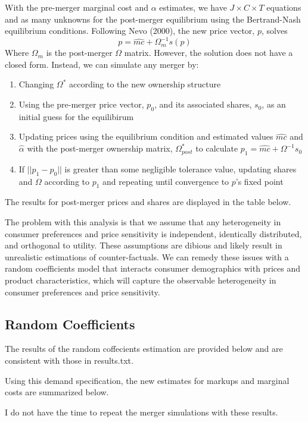 \documentclass{article}
\newcommand{\ahat}{\hat{\alpha}}
\begin{document}
\begin{center}
        
\end{center}
With the pre-merger marginal cost and $\alpha$ estimates, we have $J\times C\times T$ equations and as many unknowns for the post-merger equilibrium using the Bertrand-Nash equilibrium conditions. Following Nevo (2000), the new price vector, $p$, solves \[ 
        p = \hat{mc} + \Omega_{m}^{-1}s(p)
\]
Where $\Omega_m$ is the post-merger $\Omega$ matrix. 
However, the solution does not have a closed form. Instead, we can simulate any merger by:
\begin{enumerate}
        \item Changing $\Omega^*$ according to the new ownership structure
        \item Using the pre-merger price vector, $p_0$, and its associated shares, $s_0$, as an initial guess for the equilibirum
        \item Updating prices using the equilibrium condition and estimated values $\hat{mc}$ and $\ahat$ with the post-merger ownership matrix, $\Omega^*_{post}$ to calculate ${p_1 = \hat{mc} + \Omega^{-1}s_0}$
        \item If $||p_1-p_0||$ is greater than some negligible tolerance value, updating shares and $\Omega$ according to $p_1$ and repeating until convergence to $p$'s fixed point
\end{enumerate}
The results for post-merger prices and shares are displayed in the table below.
\begin{center}
        
\end{center}
The problem with this analysis is that we assume that any heterogeneity in consumer preferences and price sensitivity is independent, identically distributed, and orthogonal to utility. These assumptions are dibious and likely result in unrealistic estimations of counter-factuals. We can remedy these issues with a random coefficients model that interacts consumer demographics with prices and product characteristics, which will capture the observable heterogeneity in consumer preferences and price sensitivity.

\subsection*{Random Coefficients}
The results of the random coffecients estimation are provided below and are consistent with those in results.txt.
\begin{center}  
        
\end{center}
Using this demand specification, the new estimates for markups and marginal costs are summarized below. 
\begin{center}  
        
\end{center}
I do not have the time to repeat the merger simulations with these results.
\end{document}
